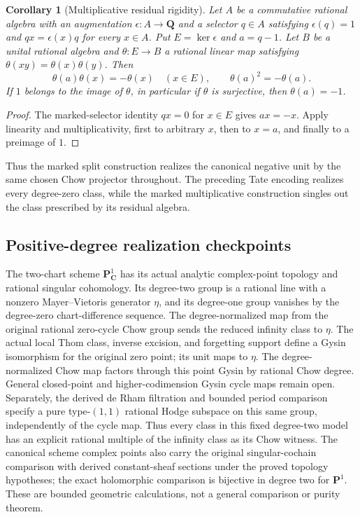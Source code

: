 \documentclass[11pt]{article}
\newtheorem{corollary}[theorem]{Corollary}
\theoremstyle{definition}
\theoremstyle{remark}
\newcommand{\Q}{\mathbf Q}
\begin{document}
\begin{corollary}[Multiplicative residual rigidity]
\label{cor:multiplicative-residual-rigidity}
Let \(A\) be a commutative rational algebra with an augmentation
\(\epsilon:A\to\Q\) and a selector \(q\in A\) satisfying
\(\epsilon(q)=1\) and \(qx=\epsilon(x)q\) for every \(x\in A\).
Put \(E=\ker\epsilon\) and \(a=q-1\).  Let \(B\) be a unital rational
algebra and \(\theta:E\to B\) a rational linear map satisfying
\(\theta(xy)=\theta(x)\theta(y)\).  Then
\[
 \theta(a)\theta(x)=-\theta(x)\quad(x\in E),\qquad
 \theta(a)^2=-\theta(a).
\]
If \(1\) belongs to the image of \(\theta\), in particular if
\(\theta\) is surjective, then \(\theta(a)=-1\).
\end{corollary}

\begin{proof}
The marked-selector identity \(qx=0\) for \(x\in E\) gives
\(ax=-x\).  Apply linearity and multiplicativity, first to arbitrary
\(x\), then to \(x=a\), and finally to a preimage of \(1\).
\end{proof}

Thus the marked split construction realizes the canonical negative unit
by the same chosen Chow projector throughout.  The preceding Tate
encoding realizes every degree-zero class, while the marked multiplicative
construction singles out the class prescribed by its residual algebra.

\subsection{Positive-degree realization checkpoints}
\label{sec:positive-realization}

The two-chart scheme \(\mathbf P^1_{\mathbf C}\) has its actual analytic complex-point
topology and rational singular cohomology. Its degree-two group is a rational
line with a nonzero Mayer--Vietoris generator \(\eta\), and its degree-one
group vanishes by the degree-zero chart-difference sequence. The
degree-normalized map from the original rational zero-cycle Chow group sends
the reduced infinity class to \(\eta\). The actual local Thom class, inverse
excision, and forgetting support define a Gysin isomorphism for the original
zero point; its unit maps to \(\eta\). The degree-normalized Chow map factors
through this point Gysin by rational Chow degree. General closed-point and
higher-codimension Gysin cycle maps remain open. Separately, the derived de
Rham filtration and bounded period
comparison specify a pure type-\((1,1)\) rational Hodge subspace on this same
group, independently of the cycle map. Thus every class in this fixed
degree-two model has an explicit rational multiple of the infinity class
as its Chow witness. The canonical scheme complex points also carry the
original singular-cochain comparison with derived constant-sheaf sections
under the proved topology hypotheses; the exact holomorphic comparison is
bijective in degree two for \(\mathbf P^1\). These are bounded geometric
calculations, not a general comparison or purity theorem.
\end{document}
